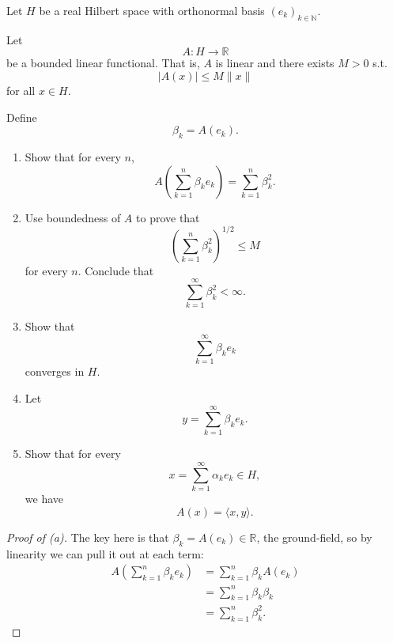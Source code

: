 \begin{prob}
    Let $H$ be a real Hilbert space with orthonormal basis 
    $(e_k)_{k\in\mathbb N}$. 

    Let 
    \[
        A : H \to \mathbb R
    \]
    be a bounded linear functional. That is, $A$ is linear 
    and there exists $M > 0$ s.t. 
    \[
        |A(x)| \leq M\|x\|
    \]
    for all $x \in H$.

    Define 
    \[
        \beta_k = A(e_k).
    \]

    \begin{enumerate}[label=\alph*)]
        \item Show that for every $n$, 
            \[
                A\left(\sum_{k=1}^n \beta_ke_k\right)   
                = \sum_{k=1}^n \beta_k^2.
            \]
        \item Use boundedness of $A$ to prove that 
            \[
                \left(\sum_{k=1}^n \beta_k^2\right)^{1/2} 
                \leq M
            \]
            for every $n$.
            Conclude that 
            \[
                \sum_{k=1}^\infty \beta_k^2 < \infty.
            \]
        \item Show that 
            \[
                \sum_{k=1}^\infty \beta_k e_k
            \]
            converges in $H$. 
        \item[] Let 
            \[
                y = \sum_{k=1}^\infty \beta_k e_k.
            \]
        \item Show that for every 
            \[
                x = \sum_{k=1}^\infty \alpha_k e_k \in H,
            \]
            we have 
            \[
                A(x) = \langle x,y \rangle.
            \]
    \end{enumerate}
\end{prob}
\begin{proof}[Proof of (a)]
    The key here is that $\beta_k = A(e_k) \in \mathbb R$, the 
    ground-field, so by linearity we can pull it out at each 
    term: 
    \begin{align*}
        A\left(\sum_{k=1}^n \beta_k e_k\right)
        &= 
        \sum_{k=1}^n \beta_k A(e_k) \\  
        &= \sum_{k=1}^n \beta_k \beta_k \\ 
        &= \sum_{k=1}^n \beta_k^2.
    \end{align*}
\end{proof}
